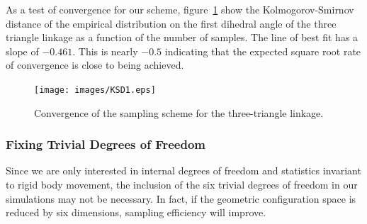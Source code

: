 As a test of convergence for our scheme, figure~\ref{fig:KSD1} show the Kolmogorov-Smirnov distance of the empirical distribution on the first dihedral angle of the three triangle linkage as a function of the number of samples. The line of best fit has a slope of $-0.461$. This is nearly $-0.5$ indicating that the expected square root rate of convergence is close to being achieved. 
\begin{figure}[ht]
\centering
  \texttt{[image: images/KSD1.eps]}
\caption{Convergence of the sampling scheme for the three-triangle linkage.}
\label{fig:KSD1}
\end{figure}


\subsubsection{Fixing Trivial Degrees of Freedom}

Since we are only interested in internal degrees of freedom and statistics invariant to rigid body movement, the inclusion of the six trivial degrees of freedom in our simulations may not be necessary. In fact, if the geometric configuration space is reduced by six dimensions, sampling efficiency will improve. 

